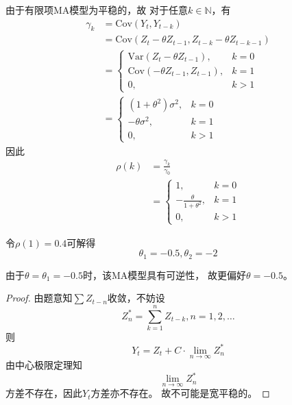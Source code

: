 \documentclass[cn]{homework}
\begin{document}
    \problem
    \begin{subproblem}[(\alph*)]
        \item\label{pb:acf}
        \newcommand{\Cov}{\mathrm{Cov}}
        \newcommand{\Var}{\mathrm{Var}}
        由于有限项MA模型为平稳的，故
        对于任意$k\in\mathbb N$，有
        \[\begin{aligned}
            \gamma_k&=\Cov(Y_t,Y_{t-k})\\
                    &=\Cov(Z_t-\theta Z_{t-1},Z_{t-k}-\theta Z_{t-k-1})\\
                    &=\begin{cases}
                        \Var(Z_t-\theta Z_{t-1}),&k=0\\
                        \Cov(-\theta Z_{t-1},Z_{t-1}),&k=1\\
                        0,&k>1
                    \end{cases}\\
                    &=\begin{cases}
                        (1+\theta^2)\sigma^2,&k=0\\
                        -\theta\sigma^2,&k=1\\
                        0,&k>1
                    \end{cases}
        \end{aligned}\]
        因此
        \[\begin{aligned}
            \rho(k)&=\frac{\gamma_k}{\gamma_0}\\
                   &=\begin{cases}
                        1,&k=0\\
                        -\frac{\theta}{1+\theta^2},&k=1\\
                        0,&k>1
                   \end{cases}
        \end{aligned}\]

        \item
        令$\rho(1)=0.4$可解得
        \[\theta_1=-0.5,\theta_2=-2\]

        由于$\theta=\theta_1=-0.5$时，该MA模型具有可逆性，
        故更偏好$\theta=-0.5$。

        \item
        \begin{proof}
            由题意知$\sum Z_{t-n}$收敛，不妨设
            \[Z^*_n=\sum_{k=1}^nZ_{t-k},n=1,2,\ldots\]
            则
            \begin{equation}
                \label{eq:partial sum}
                Y_t=Z_t+C\cdot\lim_{n\to\infty}Z^*_n
            \end{equation}
            由中心极限定理知
            \[\lim_{n\to\infty}Z^*_n\]
            方差不存在，因此$Y_t$方差亦不存在。
            故不可能是宽平稳的。
        \end{proof}


\end{subproblem}
\end{document}
